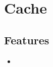 \section{Cache}
\label{module:Cache}

\subsection{Features}
\begin{itemize}
	\item {}
\end{itemize}

